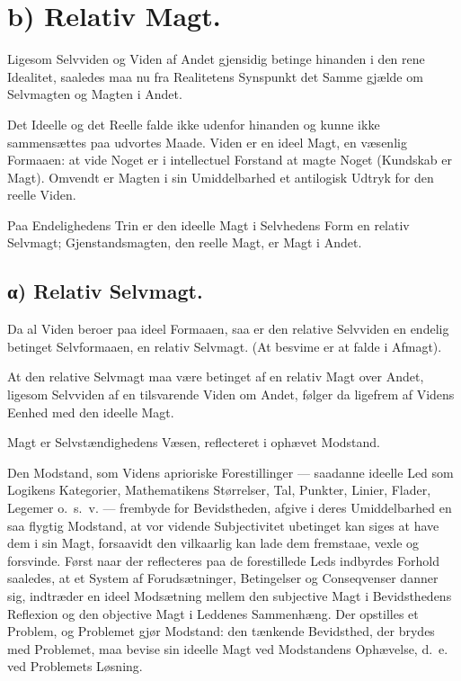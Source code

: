 \documentclass[12pt]{book}
\newcommand{\opage}[1]{\marginnote{\footnotesize\textit{[#1]}}}
\begin{document}
\section*{b) Relativ Magt.}

Ligesom Selvviden og Viden af Andet gjensidig betinge
hinanden i den rene Idealitet, saaledes maa nu fra
Realitetens Synspunkt det Samme gjælde om Selvmagten og
Magten i Andet.

Det Ideelle og det Reelle falde ikke udenfor hinanden
og kunne ikke sammensættes paa udvortes Maade. Viden
er en ideel Magt, en væsenlig Formaaen: at vide Noget
\opage{31} er i intellectuel Forstand at magte Noget (Kundskab er
Magt). Omvendt er Magten i sin Umiddelbarhed et
antilogisk Udtryk for den reelle Viden.

Paa Endelighedens Trin er den ideelle Magt i
Selvhedens Form en relativ Selvmagt; Gjenstandsmagten, den
reelle Magt, er Magt i Andet.

\subsection*{α) Relativ Selvmagt.}

Da al Viden beroer paa
ideel Formaaen, saa er den relative Selvviden en endelig
betinget Selvformaaen, en relativ Selvmagt. (At besvime er
at falde i Afmagt).

At den relative Selvmagt maa være betinget af en
relativ Magt over Andet, ligesom Selvviden af en tilsvarende
Viden om Andet, følger da ligefrem af Videns Eenhed med
den ideelle Magt.

Magt er Selvstændighedens Væsen, reflecteret i
ophævet Modstand.

Den Modstand, som Videns aprioriske Forestillinger ---
saadanne ideelle Led som Logikens Kategorier,
Mathematikens Størrelser, Tal, Punkter, Linier, Flader, Legemer
o.~s.~v. --- frembyde for Bevidstheden, afgive i deres
Umiddelbarhed en saa flygtig Modstand, at vor vidende
Subjectivitet ubetinget kan siges at have dem i sin Magt,
forsaavidt den vilkaarlig kan lade dem fremstaae, vexle og
forsvinde. Først naar der reflecteres paa de forestillede Leds
indbyrdes Forhold saaledes, at et System af
Forudsætninger, Betingelser og Conseqvenser danner sig, indtræder en
ideel Modsætning mellem den subjective Magt i
Bevidsthedens Reflexion og den objective Magt i Leddenes
Sammenhæng. Der opstilles et Problem, og Problemet gjør
Modstand: den tænkende Bevidsthed, der brydes med
Problemet, maa bevise sin ideelle Magt ved Modstandens
Ophævelse, d.~e. ved Problemets Løsning.
\end{document}
